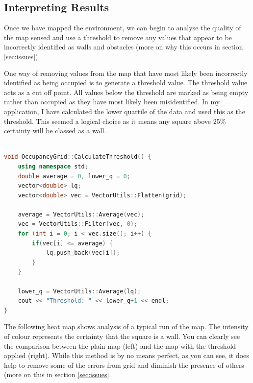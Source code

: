 \documentclass{article}
\begin{document}
\subsection{Interpreting Results}
Once we have mapped the environment, we can begin to analyse the quality of the map sensed and use a threshold to remove any values that appear to be incorrectly identified as walls and obstacles (more on why this occurs in section \ref{sec:issues})

One way of removing values from the map that have most likely been incorrectly identified as being occupied is to generate a threshold value. The threshold value acts as a cut off point. All values below the threshold are marked as being empty rather than occupied as they have most likely been misidentified. In my application, I have calculated the lower quartile of the data and used this as the threshold. This seemed a logical choice as it means any square above 25\% certainty will be classed as a wall. 

\begin{center}
	\begin{lstlisting}[language=c++, showstringspaces=false, caption={C++ code used to calculate the threshold value for the grid}]

void OccupancyGrid::CalculateThreshold() {
	using namespace std;
	double average = 0, lower_q = 0;
	vector<double> lq;
	vector<double> vec = VectorUtils::Flatten(grid);
	
	average = VectorUtils::Average(vec);
	vec = VectorUtils::Filter(vec, 0);
	for (int i = 0; i < vec.size(); i++) {
		if(vec[i] <= average) {
			lq.push_back(vec[i]);
		}
	}

	lower_q = VectorUtils::Average(lq);
	cout << "Threshold: " << lower_q+1 << endl;
}

	\end{lstlisting}
\end{center}

The following heat map shows analysis of a typical run of the map. The intensity of colour represents the certainty that the square is a wall. You can clearly see the comparison between the plain map (left) and the map with the threshold applied (right). While this method is by no means perfect, as you can see, it does help to remove some of the errors from grid and diminish the presence of others (more on this in section \ref{sec:issues}.
 
\end{document}
